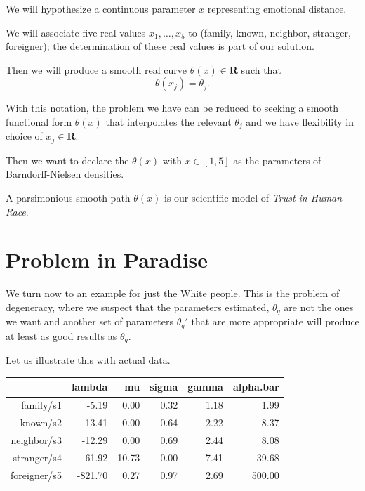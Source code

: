 \documentclass{amsart}
\begin{document}
We will hypothesize a continuous parameter $x$ representing emotional distance.

We will associate five real values $x_1,\dots, x_5$ to (family, known, neighbor, stranger, foreigner); the determination of these real values is part of our solution.

Then we will produce a smooth real curve $\theta(x) \in \mathbf{R}$ such that 
\[
\theta(x_j) = \theta_j.
\]

With this notation, the problem we have can be reduced to seeking a smooth functional form $\theta(x)$ that interpolates the relevant $\theta_j$ and we have flexibility in choice of $x_j\in\mathbf{R}$.

Then we want to declare the $\theta(x)$ with $x \in [1,5]$ as the parameters of Barndorff-Nielsen densities.

A parsimonious smooth path $\theta(x)$ is our scientific model of {\em Trust in Human Race}.

\section{Problem in Paradise}

We turn now to an example for just the White people.  This is the problem of degeneracy, where we suspect that the parameters estimated, $\theta_q$ are not the ones we want and another set of parameters $\theta_q'$ that are more appropriate will produce at least as good results as $\theta_q$.

Let us illustrate this with actual data.

\begin{table}[ht]
\centering
\begin{tabular}{rrrrrr}
  \hline
 & lambda & mu & sigma & gamma & alpha.bar \\ 
  \hline
family/s1 & -5.19 & 0.00 & 0.32 & 1.18 & 1.99 \\ 
  known/s2 & -13.41 & 0.00 & 0.64 & 2.22 & 8.37 \\ 
  neighbor/s3 & -12.29 & 0.00 & 0.69 & 2.44 & 8.08 \\ 
  stranger/s4 & -61.92 & 10.73 & 0.00 & -7.41 & 39.68 \\ 
  foreigner/s5 & -821.70 & 0.27 & 0.97 & 2.69 & 500.00 \\ 
   \hline
\end{tabular}
\end{table}
\end{document}
